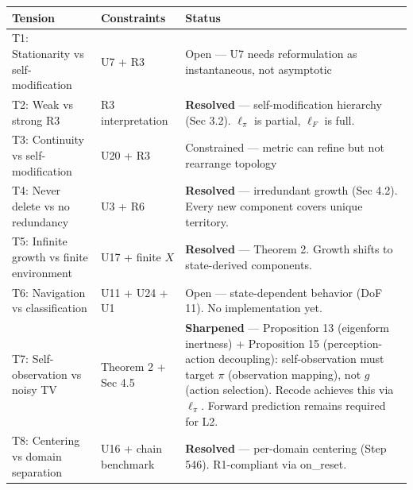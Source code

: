 \documentclass[
  11pt,
]{article}
\newcounter{none} %
\begin{document}
{\def\LTcaptype{none} %
\begin{longtable}[]{@{}
  >{\raggedright\arraybackslash}p{}
  >{\raggedright\arraybackslash}p{}
  >{\raggedright\arraybackslash}p{}@{}}
\toprule\noalign{}
\begin{minipage}[b]{\linewidth}\raggedright
Tension
\end{minipage} & \begin{minipage}[b]{\linewidth}\raggedright
Constraints
\end{minipage} & \begin{minipage}[b]{\linewidth}\raggedright
Status
\end{minipage} \\
\midrule\noalign{}
\endhead
\bottomrule\noalign{}
\endlastfoot
T1: Stationarity vs self-modification & U7 + R3 & Open --- U7 needs
reformulation as instantaneous, not asymptotic \\
T2: Weak vs strong R3 & R3 interpretation & \textbf{Resolved} ---
self-modification hierarchy (Sec 3.2). \(\ell_\pi\) is partial,
\(\ell_F\) is full. \\
T3: Continuity vs self-modification & U20 + R3 & Constrained --- metric
can refine but not rearrange topology \\
T4: Never delete vs no redundancy & U3 + R6 & \textbf{Resolved} ---
irredundant growth (Sec 4.2). Every new component covers unique
territory. \\
T5: Infinite growth vs finite environment & U17 + finite \(X\) &
\textbf{Resolved} --- Theorem 2. Growth shifts to state-derived
components. \\
T6: Navigation vs classification & U11 + U24 + U1 & Open ---
state-dependent behavior (DoF 11). No implementation yet. \\
T7: Self-observation vs noisy TV & Theorem 2 + Sec 4.5 &
\textbf{Sharpened} --- Proposition 13 (eigenform inertness) +
Proposition 15 (perception-action decoupling): self-observation must
target \(\pi\) (observation mapping), not \(g\) (action selection).
Recode achieves this via \(\ell_\pi\). Forward prediction remains
required for L2. \\
T8: Centering vs domain separation & U16 + chain benchmark &
\textbf{Resolved} --- per-domain centering (Step 546). R1-compliant via
on\_reset. \\
\end{longtable}
}
\end{document}
